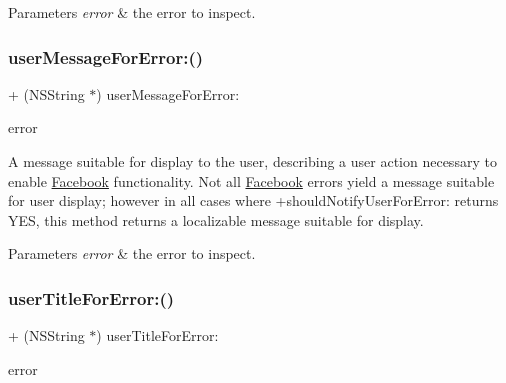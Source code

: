 \begin{DoxyParams}{Parameters}
{\em error} & the error to inspect. \\
\hline
\end{DoxyParams}
\mbox{\label{interfaceFBErrorUtility_a059cc6fc35dd8fd3a13ee584ca7bb391}} 
\subsubsection{\texorpdfstring{user\+Message\+For\+Error\+:()}{userMessageForError:()}\hspace{0.1cm}{\footnotesize\ttfamily [5/5]}}
{\footnotesize\ttfamily + (N\+S\+String $\ast$) user\+Message\+For\+Error\+: \begin{DoxyParamCaption}\item[{(N\+S\+Error $\ast$)}]{error }\end{DoxyParamCaption}}

A message suitable for display to the user, describing a user action necessary to enable \hyperlink{interfaceFacebook}{Facebook} functionality. Not all \hyperlink{interfaceFacebook}{Facebook} errors yield a message suitable for user display; however in all cases where +should\+Notify\+User\+For\+Error\+: returns Y\+ES, this method returns a localizable message suitable for display.


\begin{DoxyParams}{Parameters}
{\em error} & the error to inspect. \\
\hline
\end{DoxyParams}
\mbox{\label{interfaceFBErrorUtility_a6b294817d5d939cfa12975d994d1dd8b}} 
\subsubsection{\texorpdfstring{user\+Title\+For\+Error\+:()}{userTitleForError:()}\hspace{0.1cm}{\footnotesize\ttfamily [1/5]}}
{\footnotesize\ttfamily + (N\+S\+String $\ast$) user\+Title\+For\+Error\+: \begin{DoxyParamCaption}\item[{(N\+S\+Error $\ast$)}]{error }\end{DoxyParamCaption}}


